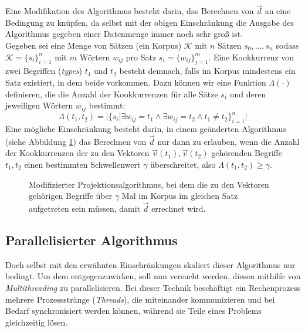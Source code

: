 Eine Modifikation des Algorithmus besteht darin, das Berechnen von $\vec{d}$ an eine Bedingung zu knüpfen, da selbst
mit der obigen Einschränkung die Ausgabe des Algorithmus gegeben einer Datenmenge immer noch sehr groß ist.\\

Gegeben sei eine Menge von Sätzen (ein Korpus) $\mathcal{K}$ mit $n$ Sätzen $s_0, \ldots, s_n$ sodass $\mathcal{K} = \{s_i\}_{i=1}^{n}$ mit
$m$ Wörtern $w_{ij}$ pro Satz $s_i = \{w_{ij}\}_{j=1}^m$. Eine Kookkurrenz von zwei Begriffen (\emph{types}) $t_1$ und $t_2$
besteht demnach, falls im Korpus mindestens ein Satz existiert, in dem beide vorkommen. Dazu können wir
eine Funktion $\Lambda(\cdot)$ definieren, die die Anzahl der Kookkurrenzen für alle Sätze $s_i$ und deren jeweiligen
Wörtern $w_{ij}$ bestimmt:
\begin{equation}\label{form:lambda-cooc}
  \Lambda(t_1, t_2) = |\{s_i | \exists w_{ij} = t_1 \land \exists w_{ij} = t_2 \land t_1\neq t_2\}_{i=1}^{n}|
\end{equation}
Eine mögliche Einschränkung besteht darin, in einem geänderten Algorithmus (siehe Abbildung \ref{fig:algo2}) das Berechnen von $\vec{d}$ nur
dann zu erlauben, wenn die Anzahl der Kookkurrenzen der zu den Vektoren $\vec{v}(t_1), \vec{v}(t_2)$ gehörenden Begriffe $t_1, t_2$
einen bestimmten Schwellenwert $\gamma$ überschreitet, also $\Lambda(t_1, t_2) \geq \gamma$.

\begin{figure}[h]
  \centering
  \begin{algorithm}[H]
  \end{algorithm}
  \caption[Modifizierter Projektionsalgorithmus]{Modifizierter Projektionsalgorithmus, bei dem die zu den Vektoren gehörigen
  Begriffe über $\gamma$ Mal im Korpus im gleichen Satz aufgetreten sein müssen, damit $\vec{d}$ errechnet wird.\label{fig:algo2}}
\end{figure}


\subsection{Parallelisierter Algorithmus}\label{sec:para-algo}

Doch selbst mit den erwähnten Einschränkungen skaliert dieser Algorithmus nur bedingt. Um dem entgegenzuwirken, soll nun
versucht werden, diesen mithilfe von \emph{Multithreading} zu parallelisieren. Bei dieser Technik beschäftigt ein Rechenprozess
mehrere Prozessstränge (\emph{Threads}), die miteinander kommunizieren und bei Bedarf synchronisiert werden können,
während sie Teile eines Problems gleichzeitig lösen.\\

